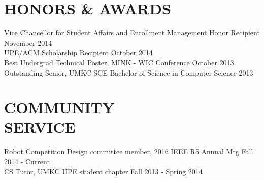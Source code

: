 \documentclass[line,margin]{res}
\begin{document}
\begin{resume}
\section{HONORS \& AWARDS}
		Vice Chancellor for Student Affairs and Enrollment Management Honor Recipient \hfill November 2014\\
		UPE/ACM Scholarship Recipient \hfill October 2014 \\
		Best Undergrad Technical Poster, MINK - WIC Conference \hfill October 2013	\\
		Outstanding Senior, UMKC SCE Bachelor of Science in Computer Science \hfill 2013
\section{COMMUNITY \\ SERVICE}  
		Robot Competition Design committee member, 2016 IEEE R5 Annual Mtg \hfill Fall 2014 - Current \\  
            	CS Tutor, UMKC UPE student chapter  \hfill Fall 2013 - Spring 2014 
\end{resume}
\end{document}
